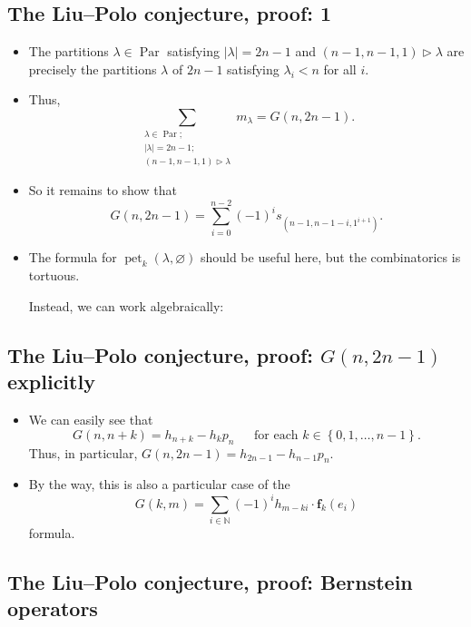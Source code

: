 \documentclass[numbers=enddot,12pt,final,onecolumn,notitlepage]{scrartcl}%
\newcommand{\Par}{\operatorname{Par}}
\newcommand{\0}{\phantom{c}}
\let\sumnonlimits\sum
\renewcommand{\sum}{\sumnonlimits\limits}
\begin{document}
\subsection{The Liu--Polo conjecture, proof: 1}

\begin{itemize}
\item The partitions $\lambda\in\operatorname*{Par}$
satisfying $\left|\lambda\right| = 2n-1$
and $\left(  n-1,n-1,1\right)  \triangleright\lambda$ are precisely the
partitions $\lambda$ of $2n-1$ satisfying
$\lambda_{i}<n$ for all $i$.

\item Thus,
\[
\sum_{\substack{\lambda\in\Par;\\ \left|\lambda\right| = 2n-1;\\\left(
n-1,n-1,1\right)  \triangleright\lambda}}m_{\lambda}
=G\left(  n,2n-1\right)
.
\]


\item So it remains to show that%
\[
G\left(  n,2n-1\right)  =\sum_{i=0}^{n-2}\left(  -1\right)  ^{i}s_{\left(
n-1,n-1-i,1^{i+1}\right)  }.
\]


\item The formula for $\operatorname*{pet}\nolimits_{k}\left(  \lambda
,\varnothing\right)  $ should be useful here, but the combinatorics is tortuous.

Instead, we can work algebraically:
\end{itemize}

\subsection{The Liu--Polo conjecture, proof: $G(n, 2n-1)$ explicitly}

\begin{itemize}
\item We can easily see that
\[
G\left(  n,n+k\right)  =h_{n+k}-h_{k}p_{n}\ \ \ \ \ \ \ \text{for each }%
k\in\left\{  0,1,\ldots,n-1\right\}  .
\]
Thus, in particular, $G\left(  n,2n-1\right)  =h_{2n-1}-h_{n-1}p_{n}$.

\item By the way, this is also a particular case of the
\[
G\left(  k,m\right)  =\sum_{i\in\mathbb{N}}\left(  -1\right)  ^{i}%
h_{m-ki}\cdot\mathbf{f}_{k}\left(  e_{i}\right)
\]
formula.
\end{itemize}

\subsection{The Liu--Polo conjecture, proof: Bernstein operators}
\end{document}
